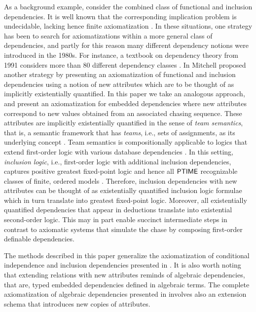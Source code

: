 \documentclass[envcountset]{llncs}
\newcommand{\problemFont}[1]{\protect\ensuremath{\mathsf{#1}}}
\newcommand{\PTIME}{\problemFont{PTIME}}
\begin{document}
As a background example, consider the combined class of functional and inclusion dependencies. It is well known that the corresponding implication problem is undecidable, lacking hence finite axiomatization \cite{chandra85,mitchell83}.  In these situations, one strategy has been to search for axiomatizations within a more general class of   dependencies, and partly for this reason many different dependency notions were introduced in the 1980s. For instance, a textbook on dependency theory from 1991 considers more than  80 different dependency classes \cite{thalheim91}. In \cite{mitchell83b} Mitchell proposed  another strategy by presenting an axiomatization of functional and inclusion dependencies using a notion of new attributes which are to be thought of as implicitly existentially quantified. In this paper we take an analogous approach, and present an axiomatization for embedded dependencies where new attributes correspond to new  values obtained from an associated chasing sequence. These attributes are implicitly existentially quantified in the sense of \emph{team semantics}, that is, a semantic framework that has \emph{teams}, i.e.,  sets of assignments, as its underlying concept \cite{hodges97}. Team semantics is compositionally applicable to logics that extend first-order logic with various database dependencies \cite{galliani12,vaananen07}.  In this setting, \emph{inclusion logic}, i.e., first-order logic with additional inclusion dependencies, captures positive greatest fixed-point logic and hence all $\PTIME$ recognizable classes of finite, ordered models \cite{gallhella13,immerman86,vardi82}. Therefore, inclusion dependencies with new attributes can be  thought of as existentially quantified inclusion logic formulae which in turn translate into greatest fixed-point logic. Moreover, all existentially quantified dependencies that appear in deductions translate into existential second-order logic. This may in part enable succinct intermediate  steps in contrast to axiomatic systems that simulate the chase by composing first-order definable dependencies. 

The methods described in this paper generalize the axiomatization of conditional independence and inclusion dependencies presented in \cite{hannula14}. It is also worth noting that extending relations with new attributes reminds of algebraic dependencies, that are, typed embedded dependencies defined in algebraic terms. The complete axiomatization of algebraic dependencies presented in \cite{yannakakis82} involves also an extension schema that introduces new copies of attributes.
\end{document}
